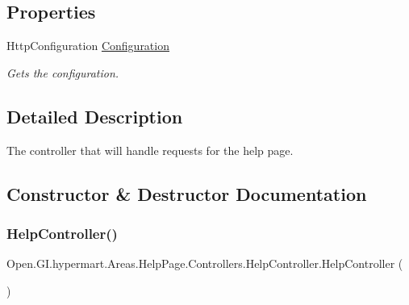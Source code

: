 \subsection*{Properties}
\begin{DoxyCompactItemize}
\item 
Http\+Configuration \hyperlink{class_open_1_1_g_i_1_1hypermart_1_1_areas_1_1_help_page_1_1_controllers_1_1_help_controller_ac1327fb5827701100fa4e1b3566fd752}{Configuration}
\begin{DoxyCompactList}\small\item\em Gets the configuration. \end{DoxyCompactList}\end{DoxyCompactItemize}


\subsection{Detailed Description}
The controller that will handle requests for the help page. 



\subsection{Constructor \& Destructor Documentation}
\hypertarget{class_open_1_1_g_i_1_1hypermart_1_1_areas_1_1_help_page_1_1_controllers_1_1_help_controller_afa0b9b820c64c6b4f58818ea7a8fbee9}{}\label{class_open_1_1_g_i_1_1hypermart_1_1_areas_1_1_help_page_1_1_controllers_1_1_help_controller_afa0b9b820c64c6b4f58818ea7a8fbee9} 
\subsubsection{\texorpdfstring{Help\+Controller()}{HelpController()}\hspace{0.1cm}{\footnotesize\ttfamily [1/2]}}
{\footnotesize\ttfamily Open.\+G\+I.\+hypermart.\+Areas.\+Help\+Page.\+Controllers.\+Help\+Controller.\+Help\+Controller (\begin{DoxyParamCaption}{ }\end{DoxyParamCaption})}



